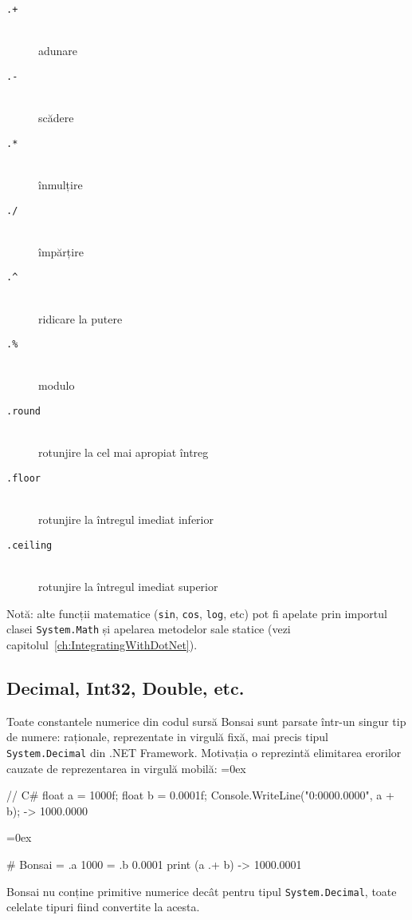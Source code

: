 \documentclass[12pt,a4paper]{memoir}
\renewcommand{\c}{\texttt}
\newenvironment{code}
{
\definecolor{shadecolor}{gray}{0.91}
\topsep=0ex
\relax
\shaded
\verbatim
}
{
\endverbatim
\endshaded
}
\begin{document}
\begin{description}
\item[\c{.+}]\hfill\\ adunare
\item[\c{.-}]\hfill\\ scădere
\item[\c{.*}]\hfill\\ înmulțire
\item[\c{./}]\hfill\\ împărțire
\item[\c{.\textasciicircum}]\hfill\\ ridicare la putere
\item[\c{.\%}]\hfill\\ modulo
\item[\c{.round}]\hfill\\ rotunjire la cel mai apropiat întreg
\item[\c{.floor}]\hfill\\ rotunjire la întregul imediat inferior
\item[\c{.ceiling}]\hfill\\ rotunjire la întregul imediat superior
\end{description}

Notă: alte funcții matematice (\c{sin}, \c{cos}, \c{log}, etc) pot fi apelate prin importul clasei \c{System.Math} și apelarea metodelor sale statice (vezi capitolul \ref{ch:IntegratingWithDotNet}).

\subsection{Decimal, Int32, Double, etc.}

Toate constantele numerice din codul sursă Bonsai sunt parsate într-un singur tip de numere: raționale, reprezentate in virgulă fixă, mai precis tipul \c{System.Decimal} din .NET Framework. Motivația o reprezintă elimitarea erorilor cauzate de reprezentarea in virgulă mobilă:
\begin{code}
// C#
float a = 1000f;
float b = 0.0001f;
Console.WriteLine("{0:0000.0000}", a + b);
  -> 1000.0000
\end{code}
\begin{code}
# Bonsai
= .a 1000
= .b 0.0001
print (a .+ b)
  -> 1000.0001
\end{code}

Bonsai nu conține primitive numerice decât pentru tipul \c{System.Decimal}, toate celelate tipuri fiind convertite la acesta.
\end{document}
